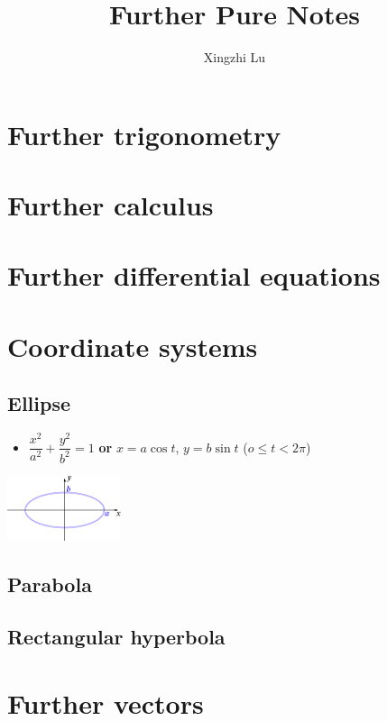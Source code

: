 \documentclass[11pt, A4paper]{article}
\title{Further Pure Notes}
\author{Xingzhi Lu}
\begin{document}
	\maketitle
	\section{Further trigonometry}
	
	
	
	\section{Further calculus}
	
	
	
	
	\section{Further differential equations}
	
	
	
	
	
	\section{Coordinate systems}
	\subsection{Ellipse}
	\begin{itemize}
		\item $\dfrac{x^2}{a^2}+\dfrac{y^2}{b^2}=1$ \textbf{or}  $x=a\cos t$, $y=b\sin t$ ($o\leq t < 2\pi$)
	\end{itemize}
	\includegraphics[width=0.25\textwidth]{ellipse}
	
	\subsection{Parabola}
	
	
	
	\subsection{Rectangular hyperbola}
	
	
	
	\section{Further vectors}
\end{document}
